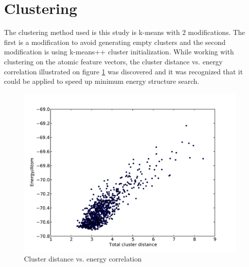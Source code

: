 \documentclass[%
 aps,
 prl,%
 amsmath,amssymb,
 reprint,%
]{revtex4-1}
\begin{document}
\section{Clustering}
The clustering method used is this study is k-means with 2
modifications. The first is a modification to avoid generating empty
clusters \cite{Malay2009} and the second modification is using
k-means++ cluster initialization. While working with clustering on the
atomic feature vectors, the cluster distance vs. energy correlation
illustrated on figure \ref{fig:fig2} was discovered and it was
recognized that it could be applied to speed up minimum energy structure search.   



\begin{figure}[h]
    \centering
    \includegraphics[width=1.0\columnwidth]{decoorL2_5_fgen_Ti13O26Ridge_9_11_9_1510066208.pdf}
    \caption{Cluster distance vs. energy correlation}
    \label{fig:fig2}
\end{figure}
\end{document}
